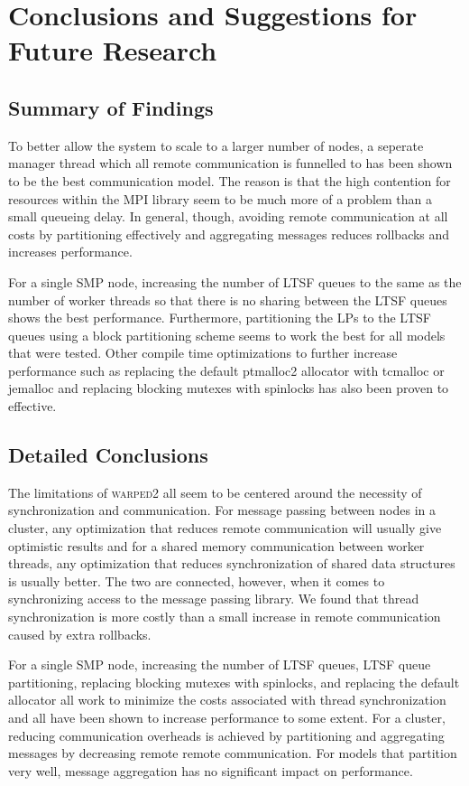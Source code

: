 \documentclass[11pt]{book}
\begin{document}
\chapter[Conclusions \& Future Research]{Conclusions and Suggestions for Future Research}
\label{conclude}

\section{Summary of Findings}

To better allow the system to scale to a larger number of nodes, a seperate manager thread which all
remote communication is funnelled to has been shown to be the best communication model. The
reason is that the high contention for resources within the MPI library seem to be much more
of a problem than a small queueing delay. In general, though, avoiding remote communication at
all costs by partitioning effectively and aggregating messages reduces rollbacks and increases
performance. 

For a single SMP node, increasing the number of LTSF queues to the same as the number of worker
threads so that there is no sharing between the LTSF queues shows the best performance. Furthermore,
partitioning the LPs to the LTSF queues using a block partitioning scheme seems to work the best
for all models that were tested. Other compile time optimizations to further increase performance
such as replacing the default ptmalloc2 allocator with tcmalloc or jemalloc and replacing blocking
mutexes with spinlocks has also been proven to effective.

\section{Detailed Conclusions}

The limitations of \textsc{warped2} all seem to be centered around the necessity of synchronization
and communication. For message passing between nodes in a cluster, any optimization
that reduces remote communication will usually give optimistic results and for a shared memory
communication between worker threads, any optimization that reduces synchronization of shared
data structures is usually better. The two are connected, however, when it comes to synchronizing
access to the message passing library. We found that thread synchronization is more costly than
a small increase in remote communication caused by extra rollbacks.

For a single SMP node, increasing the number of LTSF queues, LTSF queue partitioning,
replacing blocking mutexes with spinlocks, and replacing the default allocator all work to
minimize the costs associated with thread synchronization and all have been shown to increase
performance to some extent. For a cluster, reducing communication overheads is achieved by
partitioning and aggregating messages by decreasing remote remote communication. For models that
partition very well, message aggregation has no significant impact on performance.
\end{document}
